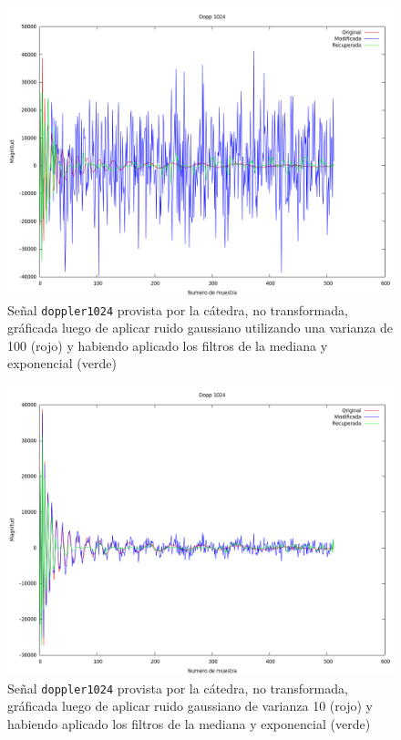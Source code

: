 \begin{figure}[H]
\begin {center}
\includegraphics[width=500pt]{imagenes/dopp1024-gauss-100-both.png}
\end {center}
\caption{Se\~nal \texttt{doppler1024} provista por la c\'atedra, no transformada, gr\'aficada
luego de aplicar ruido gaussiano utilizando una varianza de 100 (rojo) y 
habiendo aplicado los filtros de la mediana y exponencial (verde)}
\label{fig:dopcomb}
\end{figure}

\begin{figure}[H]
\begin {center}
\includegraphics[width=500pt]{imagenes/dopp1024-gauss-10-both.png}
\end {center}
\caption{Se\~nal \texttt{doppler1024} provista por la c\'atedra, no transformada, gr\'aficada
luego de aplicar ruido gaussiano de varianza 10 (rojo) y 
habiendo aplicado los filtros de la mediana y exponencial (verde)}
\label{fig:gcomb}
\end{figure}

